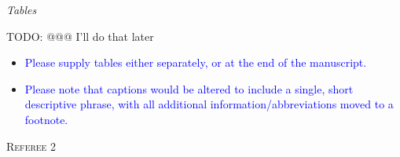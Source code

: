 \documentclass[12pt,letterpaper]{article}
\renewcommand{\section}[1]{%
\bigskip
\begin{center}
\begin{Large}
\normalfont\scshape #1
\medskip
\end{Large}
\end{center}}
\renewcommand{\subsection}[1]{%
\bigskip
\begin{center}
\begin{large}
\normalfont\itshape #1
\end{large}
\end{center}}
\begin{document}
\subsection{Tables}

TODO: @@@ I'll do that later

\begin{itemize}
\item{\textcolor{blue}{Please supply tables either separately, or at the end of the manuscript.}}
\item{\textcolor{blue}{Please note that captions would be altered to include a single, short descriptive phrase, with all additional information/abbreviations moved to a footnote.}}
\end{itemize}















\section{Referee 2}
\end{document}
